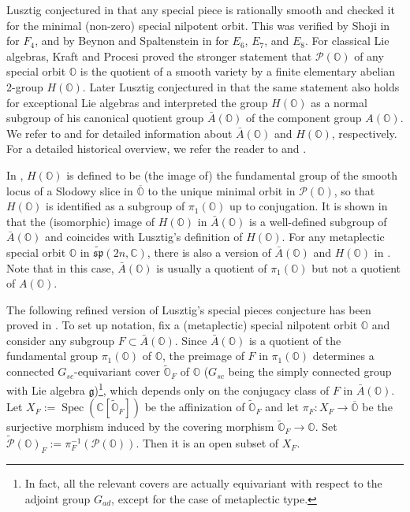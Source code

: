 \documentclass[11pt, a4paper]{amsart}
\newcommand{\C}{\mathbb{C}}
\newcommand{\orb}{\mathbb{O}}
\newcommand{\fg}{\mathfrak{g}}
\newcommand{\fmp}{\widetilde{\mathfrak{sp}}}
\newcommand{\cP}{\mathcal{P}}
\newcommand{\Abar}{\bar{A}}
\newcommand{\spec}{\operatorname{Spec}}
\theoremstyle{definition}
\numberwithin{equation}{section}
\begin{document}
Lusztig conjectured in \cite{Lusztig:green} that any special piece is rationally smooth and checked it for the minimal (non-zero) special nilpotent orbit. This was verified by Shoji in \cite{Shoji:Green} for $F_4$, and by Beynon and Spaltenstein in \cite{Beynon-Spaltenstein} for $E_6$, $E_7$, and $E_8$. For classical Lie algebras, Kraft and Procesi \cite{Kraft-Procesi:special} proved the stronger statement that $\cP(\orb)$ of any special orbit $\orb$ is the quotient of a smooth variety by a finite elementary abelian 2-group $H(\orb)$. Later Lusztig conjectured in \cite{Lusztig:unipotent} that the same statement also holds for exceptional Lie algebras and interpreted the group $H(\orb)$ as a normal subgroup of his canonical quotient group $\Abar(\orb)$ of the component group $A(\orb)$. We refer to \cite{Sommers:Duality} and \cite{JLSY:SpecialPiece} for detailed information about $\Abar(\orb)$ and $H(\orb)$, respectively. For a detailed historical overview, we refer the reader to \cite{FJLS23} and \cite{JLSY:SpecialPiece}.

In \cite{JLSY:SpecialPiece}, $H(\orb)$ is defined to be (the image of) the fundamental group of the smooth locus of a Slodowy slice in $\overline{\orb}$ to the unique minimal orbit in $\cP(\orb)$, so that $H(\orb)$ is identified as a subgroup of $\pi_1(\orb)$ up to conjugation. It is shown in \cite{JLSY:SpecialPiece} that the (isomorphic) image of $H(\orb)$ in $\Abar(\orb)$ is a well-defined subgroup of $\Abar(\orb)$ and coincides with Lusztig's definition of $H(\orb)$. For any metaplectic special orbit $\orb$ in $\fmp(2n,\C)$, there is also a version of $\Abar(\orb)$ and $H(\orb)$ in \cite{JLSY:SpecialPiece}. Note that in this case, $\Abar(\orb)$ is usually a quotient of $\pi_1(\orb)$ but not a quotient of $A(\orb)$.

The following refined version of Lusztig's special pieces conjecture has been proved in \cite{JLSY:SpecialPiece}. To set up notation, fix a (metaplectic) special nilpotent orbit $\orb$ and consider any subgroup $F \subset \Abar(\orb)$. Since $\Abar(\orb)$ is a quotient of the fundamental group $\pi_1(\orb)$ of $\orb$, the preimage of $F$ in $\pi_1(\orb)$ determines a connected $G_{sc}$-equivariant cover $\widetilde{\orb}_F$ of $\orb$ ($G_{sc}$ being the simply connected group with Lie algebra $\fg$)\footnote{In fact, all the relevant covers are actually equivariant with respect to the adjoint group $G_{ad}$, except for the case of metaplectic type.}, which depends only on the conjugacy class of $F$ in $\Abar(\orb)$. Let $X_F := \spec(\C[\widetilde{\orb}_F])$ be the affinization of $\tilde{\orb}_F$ and let $\pi_F: X_F \to \overline{\orb}$ be the surjective morphism induced by the covering morphism $\widetilde{\orb}_F \to \orb$. Set $\tilde{\cP}(\orb)_F := \pi_F^{-1}(\cP(\orb))$. Then it is an open subset of $X_F$.
\end{document}
